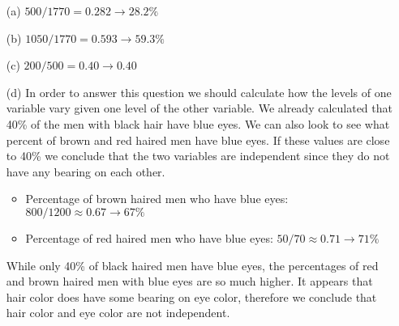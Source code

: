 {
\begin{enumerate}
\item[(a)] $500 / 1770 = 0.282 \rightarrow 28.2\% $
\item[(b)] $1050 / 1770 = 0.593 \rightarrow 59.3\%$
\item[(c)] $200 / 500 = 0.40 \rightarrow 0.40$
\item[(d)] In order to answer this question we should calculate how the levels of one variable vary given one level of the other variable. We already calculated that 40\% of the men with black hair have blue eyes. We can also look to see what percent of brown and red haired men have blue eyes. If these values are close to 40\% we conclude that the two variables are independent since they do not have any bearing on each other.
\begin{itemize}
\item Percentage of brown haired men who have blue eyes: $800 / 1200 \approx 0.67 \rightarrow 67\%$
\item Percentage of red haired men who have blue eyes: $50 / 70 \approx 0.71 \rightarrow 71\%$
\end{itemize}
While only 40\% of black haired men have blue eyes, the percentages of red and brown haired men with blue eyes are so much higher. It appears that hair color does have some bearing on eye color, therefore we conclude that hair color and eye color are not independent.
\end{enumerate}
}

